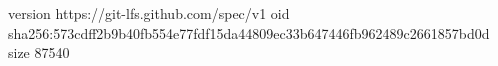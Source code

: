 version https://git-lfs.github.com/spec/v1
oid sha256:573cdff2b9b40fb554e77fdf15da44809ec33b647446fb962489c2661857bd0d
size 87540
